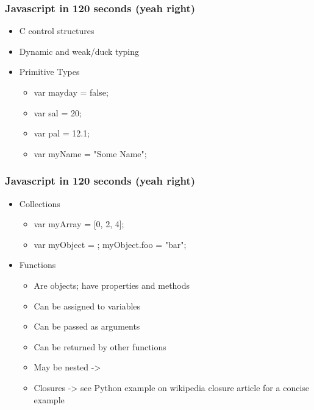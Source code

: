 \documentclass{beamer}
\begin{document}
\begin{frame}
    \frametitle{Javascript in 120 seconds (yeah right)}
    \begin{itemize}
    \item C control structures
    \item Dynamic and weak/duck typing
    \item Primitive Types
        \begin{itemize}
        \item var mayday = false;
        \item var sal = 20;
        \item var pal = 12.1;
        \item var myName = "Some Name";
        \end{itemize}
    \end{itemize}
\end{frame}


\begin{frame}
    \frametitle{Javascript in 120 seconds (yeah right)}
    \begin{itemize}
    \item Collections
        \begin{itemize}
        \item var myArray = [0, 2, 4];
        \item var myObject = {}; myObject.foo = "bar";
        \end{itemize}
    \item Functions
        \begin{itemize}
        \item Are objects; have properties and methods
        \item Can be assigned to variables
        \item Can be passed as arguments
        \item Can be returned by other functions
        \item May be nested -> 
        \item Closures -> see Python example on wikipedia closure article for a concise example
        \end{itemize}
    \end{itemize}
\end{frame}
\end{document}

